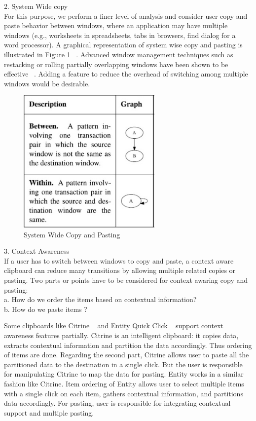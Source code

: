 \documentclass{acm_proc_article-sp}
\begin{document}
2. System Wide copy\\
For this purpose, we perform a finer level of analysis and consider user copy and paste behavior between windows, where an application may have multiple windows (e.g., worksheets in spreadsheets, tabs in browsers,  find dialog for a word processor). A graphical representation of system wise copy and pasting is illustrated in Figure \ref{fig:System} ~\cite{cpHabits}. Advanced window management techniques such as restacking or rolling partially overlapping windows have been shown to be effective ~\cite{overlapWindow}. Adding a feature to reduce the overhead of switching among multiple windows would be desirable.

 \begin{figure}[h]
 \centering
\includegraphics[width=7cm]{Window}
\caption{System Wide Copy and Pasting}
    \label{fig:System}
\end{figure} 

3. Context Awareness\\
If a user has to switch between windows to copy and paste, a context aware clipboard can reduce many transitions by allowing multiple related copies or pasting. Two parts or points have to be considered for context awaring copy and pasting:\\
    a. How do we order the items based on contextual information?\\
    b. How do we paste items ?
    
    Some clipboards like Citrine ~\cite{Citrine} and Entity Quick Click ~\cite{Entity} support context awareness features partially. Citrine is an intelligent clipboard: it copies data, extracts contextual information and partition the data accordingly. Thus ordering of items are done. Regarding the second part, Citrine allows user to paste all the partitioned data to the destination in a single click. But the user is responsible for manipulating Citrine to map the data for pasting. Entity works in a similar fashion like Citrine. Item ordering of Entity allows user to select multiple items with a single click on each item, gathers contextual information, and partitions data accordingly. For pasting, user is responsible for integrating contextual support and multiple pasting.
\end{document}
